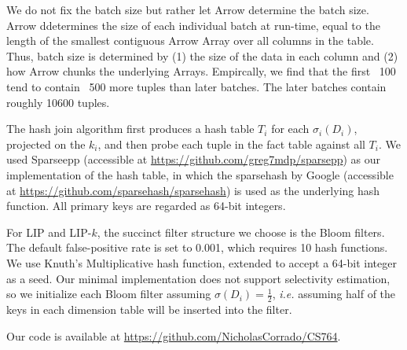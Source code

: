 We do not fix the batch size but rather let Arrow determine the batch size.
Arrow ddetermines the size of each individual batch at run-time, 
equal to the length of the smallest contiguous Arrow Array over all columns in the table.
Thus, batch size is determined by 
(1) the size of the data in each column and
(2) how Arrow chunks the underlying Arrays.
Empircally, we find that the first ~100 tend to contain ~500 more tuples than later batches.
The later batches contain roughly 10600 tuples.

The hash join algorithm first produces a hash table $T_i$ for each $\sigma_i(D_i)$, projected on the $k_i$, and then probe each tuple in the fact table against all $T_i$. We used Sparseepp (accessible at \url{https://github.com/greg7mdp/sparsepp}) as our implementation of the hash table, in which the sparsehash by Google (accessible at \url{https://github.com/sparsehash/sparsehash}) is used as the underlying hash function. All primary keys are regarded as 64-bit integers.

For LIP and LIP-$k$, the succinct filter structure we choose is the Bloom filters. 
The default false-positive rate is set to 0.001, which requires 10 hash functions.
We use Knuth's Multiplicative hash function, extended to accept a 64-bit integer as a seed. 
Our minimal implementation does not support selectivity estimation, 
so we initialize each Bloom filter assuming $\sigma(D_i) = \frac{1}{2}$, 
{\it i.e.} assuming half of the keys in each dimension table will be inserted into the filter.

Our code is available at \url{https://github.com/NicholasCorrado/CS764}.


